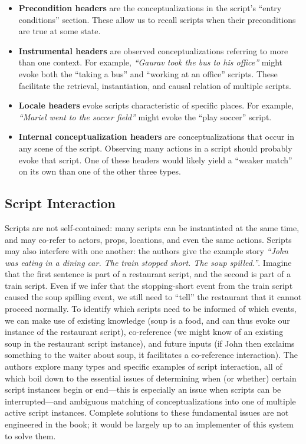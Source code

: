 \begin{itemize}
    \item \textbf{Precondition headers} are the conceptualizations in the script's ``entry conditions'' section. These allow us to recall scripts when their preconditions are true at some state.%
    
    \item \textbf{Instrumental headers} are observed conceptualizations referring to more than one context. For example, \textit{``Gaurav took the bus to his office''} might evoke both the ``taking a bus'' and ``working at an office'' scripts. These facilitate the retrieval, instantiation, and causal relation of multiple scripts.
    
    \item \textbf{Locale headers} evoke scripts characteristic of specific places. For example, \textit{``Mariel went to the soccer field''} might evoke the ``play soccer'' script.
    
    \item \textbf{Internal conceptualization headers} are conceptualizations that occur in any scene of the script. Observing many actions in a script should probably evoke that script. One of these headers would likely yield a ``weaker match'' on its own than one of the other three types.
\end{itemize}
\fi


\subsection{Script Interaction}

Scripts are not self-contained: many scripts can be instantiated at the same time, and may co-refer to actors, props, locations, and even the same actions. Scripts may also interfere with one another: the authors give the example story \textit{``John was eating in a dining car. The train stopped short. The soup spilled.''}. Imagine that the first sentence is part of a restaurant script, and the second is part of a train script. Even if we infer that the stopping-short event from the train script caused the soup spilling event, we still need to ``tell'' the restaurant that it cannot proceed normally. To identify which scripts need to be informed of which events, we can make use of existing knowledge (soup is a food, and can thus evoke our instance of the restaurant script), co-reference (we might know of an existing soup in the restaurant script instance), and future inputs (if John then exclaims something to the waiter about soup, it facilitates a co-reference interaction). The authors explore many types and specific examples of script interaction, all of which boil down to the essential issues of determining when (or whether) certain script instances begin or end---this is especially an issue when scripts can be interrupted---and ambiguous matching of conceptualizations into one of multiple active script instances. Complete solutions to these fundamental issues are not engineered in the book; it would be largely up to an implementer of this system to solve them.

